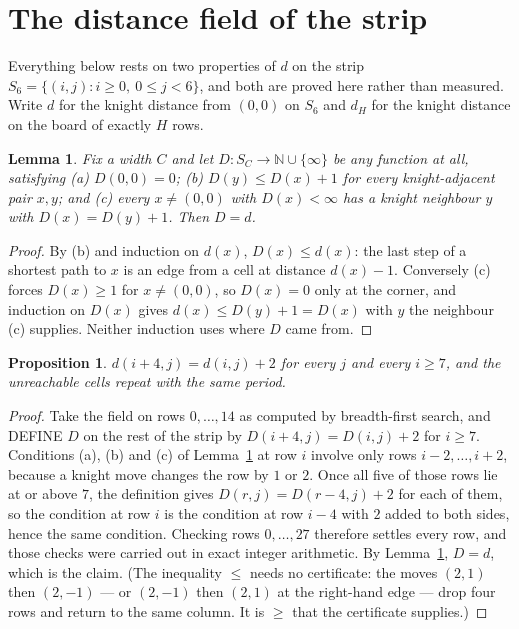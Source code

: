\documentclass[11pt,a4paper]{article}
\theoremstyle{plain}
\newtheorem{lemma}[theorem]{Lemma}
\newtheorem{proposition}[theorem]{Proposition}
\theoremstyle{definition}
\begin{document}
\section{The distance field of the strip}

Everything below rests on two properties of $d$ on the strip $S_{6}=\{(i,j): i\ge 0,\ 0\le j<6\}$, and both are proved here rather than measured. Write $d$ for the knight distance from $(0,0)$ on $S_{6}$ and $d_H$ for the knight distance on the board of exactly $H$ rows.

\begin{lemma}\label{lem:bellman}
Fix a width $C$ and let $D:S_C\to\mathbb{N}\cup\{\infty\}$ be any function at all, satisfying
(a) $D(0,0)=0$; (b) $D(y)\le D(x)+1$ for every knight-adjacent pair $x,y$; and
(c) every $x\ne(0,0)$ with $D(x)<\infty$ has a knight neighbour $y$ with $D(x)=D(y)+1$. Then $D=d$.
\end{lemma}

\begin{proof}
By (b) and induction on $d(x)$, $D(x)\le d(x)$: the last step of a shortest path to $x$ is an edge from a cell at distance $d(x)-1$. Conversely (c) forces $D(x)\ge1$ for $x\ne(0,0)$, so $D(x)=0$ only at the corner, and induction on $D(x)$ gives $d(x)\le D(y)+1=D(x)$ with $y$ the neighbour (c) supplies. Neither induction uses where $D$ came from.
\end{proof}

\begin{proposition}\label{prop:period}
$d(i+4,j)=d(i,j)+2$ for every $j$ and every $i\ge7$, and the unreachable cells repeat with the same period.
\end{proposition}

\begin{proof}
Take the field on rows $0,\dots,14$ as computed by breadth-first search, and DEFINE $D$ on the rest of the strip by $D(i+4,j)=D(i,j)+2$ for $i\ge7$. Conditions (a), (b) and (c) of Lemma~\ref{lem:bellman} at row $i$ involve only rows $i-2,\dots,i+2$, because a knight move changes the row by $1$ or $2$. Once all five of those rows lie at or above $7$, the definition gives $D(r,j)=D(r-4,j)+2$ for each of them, so the condition at row $i$ is the condition at row $i-4$ with $2$ added to both sides, hence the same condition. Checking rows $0,\dots,27$ therefore settles every row, and those checks were carried out in exact integer arithmetic. By Lemma~\ref{lem:bellman}, $D=d$, which is the claim. (The inequality $\le$ needs no certificate: the moves $(2,1)$ then $(2,-1)$ --- or $(2,-1)$ then $(2,1)$ at the right-hand edge --- drop four rows and return to the same column. It is $\ge$ that the certificate supplies.)
\end{proof}
\end{document}
